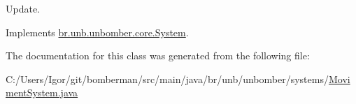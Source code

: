 Update. 



Implements \hyperlink{interfacebr_1_1unb_1_1unbomber_1_1core_1_1_system_a6b1268f3fef77e2ce797eedc1b34eb44}{br.\+unb.\+unbomber.\+core.\+System}.



The documentation for this class was generated from the following file\+:\begin{DoxyCompactItemize}
\item 
C\+:/\+Users/\+Igor/git/bomberman/src/main/java/br/unb/unbomber/systems/\hyperlink{_moviment_system_8java}{Moviment\+System.\+java}\end{DoxyCompactItemize}
